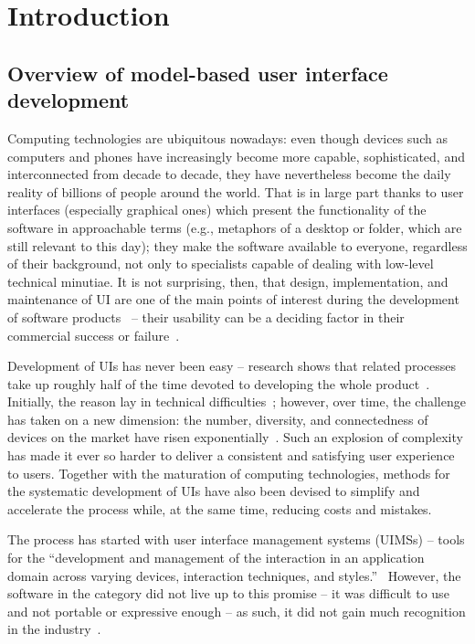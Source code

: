 \chapter{Introduction}\label{ch:introduction}

\section{Overview of model-based user interface development}\label{sec:user-interfaces-are-important}
Computing technologies are ubiquitous nowadays: even though devices such as computers and phones have increasingly become more capable, sophisticated, and interconnected from decade to decade, they have nevertheless become the daily reality of billions of people around the world.
That is in large part thanks to user interfaces (especially graphical ones) which present the functionality of the software in approachable terms (e.g., metaphors of a desktop or folder, which are still relevant to this day);
they make the software available to everyone, regardless of their background, not only to specialists capable of dealing with low-level technical minutiae.
It is not surprising, then, that design, implementation, and maintenance of UI are one of the main points of interest during the development of software products~\cite{Anderson2010} -- their usability can be a deciding factor in their commercial success or failure~\cite{Offutt2002}.

Development of UIs has never been easy -- research shows that related processes take up roughly half of the time devoted to developing the whole product~\cite{Myers1992}.
Initially, the reason lay in technical difficulties~\cite{Six1991};
however, over time, the challenge has taken on a new dimension:
the number, diversity, and connectedness of devices on the market have risen exponentially~\cite{Cisco2020}.
Such an explosion of complexity has made it ever so harder to deliver a consistent and satisfying user experience to users.
Together with the maturation of computing technologies, methods for the systematic development of UIs have also been devised to simplify and accelerate the process while, at the same time, reducing costs and mistakes.

The process has started with user interface management systems (UIMSs) -- tools for the \enquote{development and management of the interaction in an application domain across varying devices, interaction techniques, and styles.}~\cite{Betts1987}
However, the software in the category did not live up to this promise -- it was difficult to use and not portable or expressive enough -- as such, it did not gain much recognition in the industry~\cite{Myers1987}.


